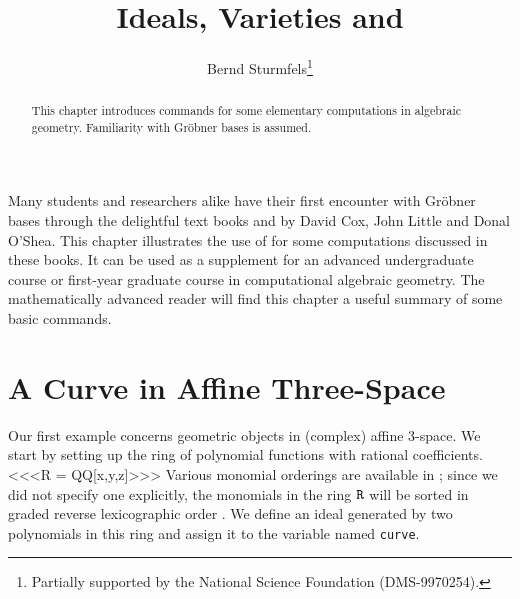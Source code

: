 \title{Ideals, Varieties and \Mtwo}
\author{Bernd Sturmfels\thanks{Partially supported by
the National Science Foundation (DMS-9970254).}}
\maketitle

\begin{abstract}
This chapter introduces \Mtwo commands for
some elementary computations in algebraic geometry.
Familiarity with Gr\"obner bases is assumed.
\end{abstract}

Many students and researchers alike have their first encounter with
Gr\"ob\-ner bases through the delightful text books \cite{CLO1} and \cite{CLO2}
by David Cox, John Little and Donal O'Shea. This chapter illustrates
the use of \Mtwo for some computations discussed in these books.
It can be used as a supplement for an advanced undergraduate course or 
first-year graduate course in computational algebraic geometry. The
mathematically advanced reader will find this chapter a useful summary
of some basic \Mtwo commands.

\section{A Curve in Affine Three-Space}

Our first example concerns geometric objects in
(complex) affine 3-space. We start by
setting up the ring of polynomial functions with rational coefficients.
<<<R = QQ[x,y,z]>>>
Various monomial orderings are available in \Mtwo; since we did not specify
one explicitly, the monomials in the ring ${\tt R}$ will be sorted in 
graded reverse lexicographic order  \cite[\S I.2, Definition 6]{CLO1}.
We define an ideal generated by two polynomials
in this ring and assign it to the variable named 
{\tt curve}.

